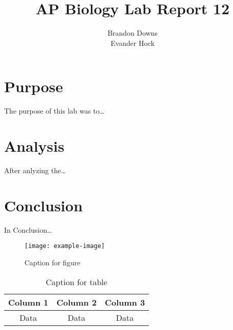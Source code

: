 \documentclass[12pt]{article}
\title{AP Biology Lab Report 12}
\author{Brandon Downs \\ Evander Hock}
\begin{document}
\maketitle

\section{Purpose}

The purpose of this lab was to\dots

\section{Analysis}

After anlyzing the\dots

\section{Conclusion}

In Conclusion\dots

\begin{figure}
    \centering
    \texttt{[image: example-image]}
    \caption{Caption for figure}
    \label{fig:label}
\end{figure}

\begin{table}
    \centering
    \begin{tabular}{|c|c|c|}
        \hline
        Column 1 & Column 2 & Column 3 \\
        \hline
        Data & Data & Data \\
        \hline
    \end{tabular}
    \caption{Caption for table}
    \label{tab:label}
\end{table}
\end{document}
